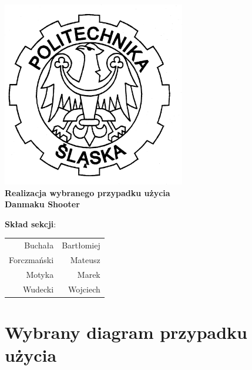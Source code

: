 \documentclass[a4paper,twoside]{article}
\begin{document}
\begin{titlepage}
		\centering
		\includegraphics[width=0.6\textwidth]{./images/logo.png}
		\\\vspace{10mm}
		\textbf{{\huge Realizacja wybranego przypadku użycia}}\\\vspace{5mm}
		\textbf{{\Huge Danmaku Shooter}}
		\\
		\vfill
		\begin{flushright}
				{\Large \textbf{Skład sekcji}:}\\
			\begin{tabular}{rr}
				{\Large Buchała} & {\Large Bartłomiej}\\[-3pt]
				{\Large Forczmański} & {\Large Mateusz}\\[-3pt]
				{\Large Motyka} & {\Large Marek}\\[-3pt]
				{\Large Wudecki} & {\Large Wojciech}
			\end{tabular}
		\end{flushright}
	\end{titlepage}

	\part{\huge \textbf{Wybrany diagram przypadku użycia}}
	
\end{document}
